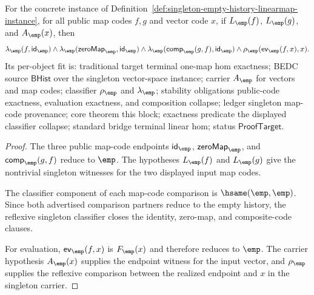 
\begin{theorem}
\label{thm:singleton-empty-history-linearmap-public-code-exactness}
For the concrete instance of
Definition~\ref{def:singleton-empty-history-linearmap-instance}, for all
public map codes $f,g$ and vector code $x$, if $L_{\emp}(f)$,
$L_{\emp}(g)$, and $A_{\emp}(x)$, then
$$
\lambda_{\emp}(f,\mathsf{id}_{\emp})\land
\lambda_{\emp}(\mathsf{zeroMap}_{\emp},\mathsf{id}_{\emp})\land
\lambda_{\emp}(\mathsf{comp}_{\emp}(g,f),\mathsf{id}_{\emp})\land
\rho_{\emp}(\mathsf{ev}_{\emp}(f,x),x).
$$
Its per-object fit is: traditional target terminal one-map hom exactness;
BEDC source $\mathsf{BHist}$ over the singleton vector-space instance;
carrier $A_{\emp}$ for vectors and map codes; classifier $\rho_{\emp}$ and
$\lambda_{\emp}$; stability obligations public-code exactness, evaluation
exactness, and composition collapse; ledger singleton map-code provenance;
core theorem this block; exactness predicate the displayed classifier
collapse; standard bridge terminal linear hom; status $\mathsf{ProofTarget}$.
\end{theorem}
\begin{proof}
The three public map-code endpoints
$\mathsf{id}_{\emp}$, $\mathsf{zeroMap}_{\emp}$, and
$\mathsf{comp}_{\emp}(g,f)$ reduce to $\emp$. The hypotheses
$L_{\emp}(f)$ and $L_{\emp}(g)$ give the nontrivial singleton witnesses for
the two displayed input map codes.

The classifier component of each map-code comparison is
$\hsame(\emp,\emp)$. Since both advertised comparison partners reduce to the
empty history, the reflexive singleton classifier closes the identity,
zero-map, and composite-code clauses.

For evaluation, $\mathsf{ev}_{\emp}(f,x)$ is $F_{\emp}(x)$ and therefore
reduces to $\emp$. The carrier hypothesis $A_{\emp}(x)$ supplies the endpoint
witness for the input vector, and $\rho_{\emp}$ supplies the reflexive
comparison between the realized endpoint and $x$ in the singleton carrier.
\end{proof}

